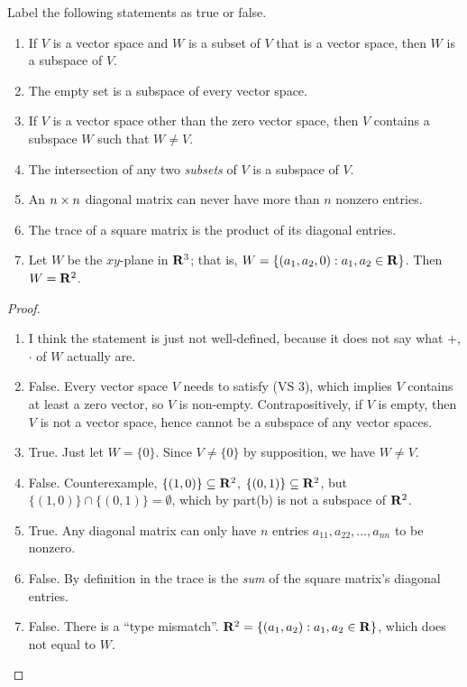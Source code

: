 \exercisesection

\begin{exercise} \label{exercise 1.3.1}
Label the following statements as true or false.
\begin{enumerate}
    \item If \(V\) is a vector space and \(W\) is a subset of \(V\) that is a vector space, then \(W\) is a subspace of \(V\).
    \item The empty set is a subspace of every vector space.
    \item If \(V\) is a vector space other than the zero vector space, then \(V\) contains a subspace \(W\) such that \(W \ne V\).
    \item The intersection of any two \emph{subsets} of \(V\) is a subspace of \(V\).
    \item An \(n \times n\) diagonal matrix can never have more than \(n\) nonzero entries.
    \item The trace of a square matrix is the product of its diagonal entries.
    \item Let \(W\) be the \(xy\)-plane in \(\mathbf{R}^3\);
          that is, \(W = \{ (a_1, a_2, 0) : a_1, a_2 \in \mathbf{R}\}\).
          Then \(W = \mathbf{R}^2\).
\end{enumerate}
\end{exercise}

\begin{proof}\ 

\begin{enumerate}
    \item I think the statement is just not well-defined, because it does not say what \(+\),  \(\cdot\) of \(W\) actually are.
    \item False.
          Every vector space \(V\) needs to satisfy  (VS 3), which implies \(V\) contains at least a zero vector, so \(V\) is non-empty.
          Contrapositively, if \(V\) is empty, then \(V\) is not a vector space, hence cannot be a subspace of any vector spaces.
    \item True. Just let \(W = \{ 0 \}\). Since \(V \ne \{ 0 \}\) by supposition, we have \(W \ne V\).
    \item False.
          Counterexample, \(\{ (1, 0) \} \subseteq \mathbf{R}^2\), \(\{ (0, 1) \} \subseteq \mathbf{R}^2\), but \(\{ (1, 0) \} \cap \{ (0, 1) \} = \emptyset\), which by part(b) is not a subspace of \(\mathbf{R}^2\).
    \item True.
          Any diagonal matrix can only have \(n\) entries \(a_{11}, a_{22}, ..., a_{nn}\) to be nonzero.
    \item False. By definition in  the trace is the \emph{sum} of the square matrix's diagonal entries.
    \item False. There is a ``type mismatch''.
          \(\mathbf{R}^2 = \{ (a_1, a_2) : a_1, a_2 \in \mathbf{R}\}\), which does not equal to \(W\).
\end{enumerate}
\end{proof}

